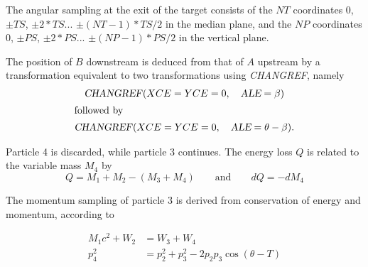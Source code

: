 \noindent The angular  sampling at the exit of the target consists of the $ NT$ 
coordinates 0,  $ \pm TS$,  $ \pm 2\ast TS$...   $\pm (NT-1)\ast TS/2 $ 
in the median plane, 
and the $ NP $ coordinates 0, $ \pm PS$,  $ \pm 2\ast PS$... $ \pm (NP-1)\ast PS/2$ 
in the vertical plane.  
\medskip

\noindent The position of $ B $ downstream is deduced from that of $ A $
upstream  by a transformation equivalent to two transformations using \textsl{CHANGREF},
 namely
 \begin{gather*}
	 \text{\textsl{CHANGREF}}(XCE=YCE=0,\quad  \textsl{ALE}=\beta )  \\
\intertext{followed by} 
	 \text{\textsl{CHANGREF}}(XCE=YCE=0,\quad \textsl{ALE}=\theta -\beta ). 
 \end{gather*}

 
\noindent Particle  4 is discarded, while particle 3 continues. The energy
loss $ Q $ is related to the variable mass $ M_4 $ by
$$ Q=M_1+M_2-(M_3+M_4)\qquad \text{and} \qquad dQ=-dM_4 $$

\noindent The momentum sampling of particle 3 is derived from conservation of
energy and 
momentum, according to 

\begin{align*}
	M_1c^2+W_2 & =  W_3+W_4  \\
	p^2_4 & =  p^2_2 +p^2_3 -2p_2p_3 \cos (\theta -T) 
\end{align*}


